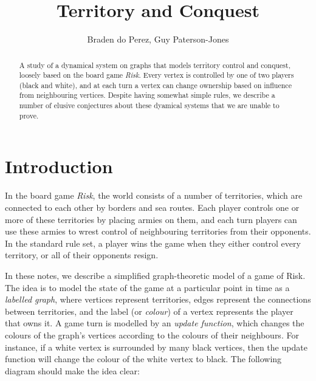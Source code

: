 \documentclass{article}
\begin{document}

\title{Territory and Conquest}
\author{Braden do Perez, Guy Paterson-Jones}

\maketitle

\begin{abstract}
  A study of a dynamical system on graphs that models territory control and conquest, loosely based on the board game \emph{Risk}. Every vertex is controlled by one of two players (black and white), and at each turn a vertex can change ownership based on influence from neighbouring vertices. Despite having somewhat simple rules, we describe a number of elusive conjectures about these dyamical systems that we are unable to prove. \cite{KrausEtAl1990}
\end{abstract}

\section{Introduction}

In the board game \emph{Risk}, the world consists of a number of territories, which are connected to each other by borders and sea routes. Each player controls one or more of these territories by placing armies on them, and each turn players can use these armies to wrest control of neighbouring territories from their opponents. In the standard rule set, a player wins the game when they either control every territory, or all of their opponents resign.

In these notes, we describe a simplified graph-theoretic model of a game of Risk. The idea is to model the state of the game at a particular point in time as a \emph{labelled graph}, where vertices represent territories, edges represent the connections between territories, and the label (or \emph{colour}) of a vertex represents the player that owns it. A game turn is modelled by an \emph{update function}, which changes the colours of the graph's vertices according to the colours of their neighbours. For instance, if a white vertex is surrounded by many black vertices, then the update function will change the colour of the white vertex to black. The following diagram should make the idea clear:
\end{document}
